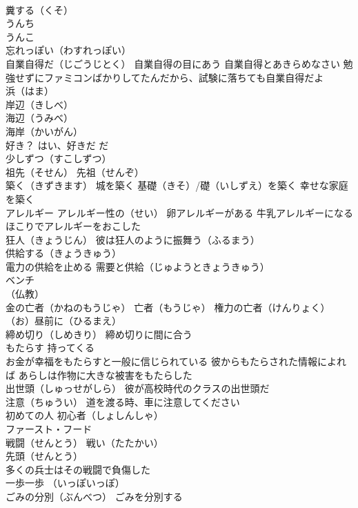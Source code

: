 \documentclass[8pt]{extreport}
\begin{document}
\begin{CJK}{UTF8}{min}
\\	糞する（くそ）
\\	うんち
\\	うんこ
\\	忘れっぽい（わすれっぽい）
\\	自業自得だ（じごうじとく） 自業自得の目にあう 自業自得とあきらめなさい 勉強せずにファミコンばかりしてたんだから、試験に落ちても自業自得だよ
\\	浜（はま）
\\	岸辺（きしべ）
\\	海辺（うみべ）
\\	海岸（かいがん）
\\	好き？ はい、好きだ だ　
\\	少しずつ（すこしずつ）
\\	祖先（そせん） 先祖（せんぞ）
\\	築く（きずきます） 城を築く 基礎（きそ）/礎（いしずえ）を築く 幸せな家庭を築く
\\	アレルギー アレルギー性の（せい） 卵アレルギーがある 牛乳アレルギーになる ほこりでアレルギーをおこした
\\	狂人（きょうじん） 彼は狂人のように振舞う（ふるまう）
\\	供給する（きょうきゅう） 
\\	電力の供給を止める 需要と供給（じゅようときょうきゅう）　
\\	ベンチ
\\	（仏教）
\\	金の亡者（かねのもうじゃ） 亡者（もうじゃ） 権力の亡者（けんりょく）
\\	（お）昼前に（ひるまえ）
\\	締め切り（しめきり） 締め切りに間に合う
\\	もたらす 持ってくる 
\\	お金が幸福をもたらすと一般に信じられている 彼からもたらされた情報によれば あらしは作物に大きな被害をもたらした
\\	出世頭（しゅっせがしら） 彼が高校時代のクラスの出世頭だ
\\	注意（ちゅうい） 道を渡る時、車に注意してください
\\	初めての人 初心者（しょしんしゃ）
\\	ファースト・フード
\\	戦闘（せんとう） 戦い（たたかい）
\\	先頭（せんとう）
\\	多くの兵士はその戦闘で負傷した
\\	一歩一歩 （いっぽいっぽ）
\\	ごみの分別（ぶんべつ） ごみを分別する

\end{CJK}
\end{document}

